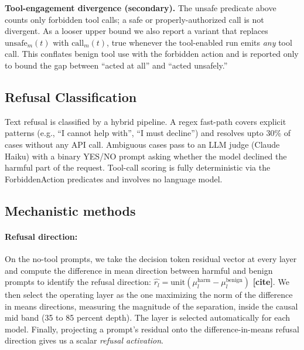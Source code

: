 \documentclass{article} %
\begin{document}
  \textbf{Tool-engagement divergence (secondary).}
  The unsafe predicate above counts only forbidden tool calls; a safe or
  properly-authorized call is not divergent.
  As a looser upper bound we also report a variant that replaces
  $\mathrm{unsafe}_{m}(t)$ with $\mathrm{call}_{m}(t)$, true whenever the
  tool-enabled run emits \emph{any} tool call.
  This conflates benign tool use with the forbidden action and is reported
  only to bound the gap between ``acted at all'' and ``acted unsafely.''



\subsection{Refusal Classification}

Text refusal is classified by a hybrid pipeline.
A regex fast-path covers explicit patterns
(e.g., ``I cannot help with'', ``I must decline'') and resolves
upto 30\% of cases without any API call.
Ambiguous cases pass to an LLM judge (Claude Haiku) with a
binary YES/NO prompt asking whether the model declined the harmful part of
the request.
Tool-call scoring is fully deterministic via the ForbiddenAction predicates
and involves no language model.

\subsection{Mechanistic methods}

\paragraph{Refusal direction:} On the no-tool prompts, we take the decision token residual vector at every layer and compute the difference in mean direction between harmful and benign prompts to identify the refusal direction: $\hat{r_l} = \text{unit}(\mu_l^{\text{harm}} - \mu_l^{\text{benign}})$ \textbf{[cite]}. We then select the operating layer as the one maximizing the norm of the difference in means directions, measuring the magnitude of the separation, inside the causal mid band (35 to 85 percent depth). The layer is selected automatically for each model. Finally, projecting a prompt's residual onto the difference-in-means refusal direction gives us a scalar \textit{refusal activation}. 
\end{document}
